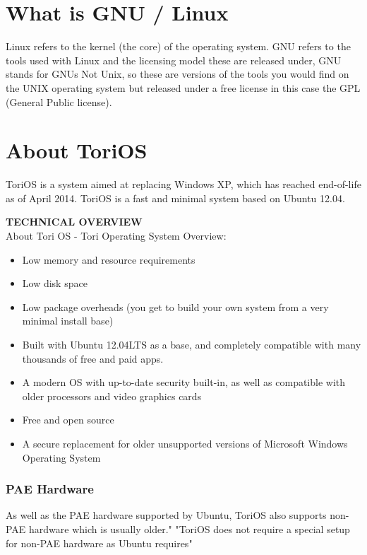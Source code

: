\documentclass[12pt,a4paper]{book}
\begin{document}
\chapter{What is GNU / Linux}

Linux refers to the kernel (the core) of the operating system.  GNU refers to the tools used with Linux and the licensing model these are released under,  GNU stands for GNUs Not Unix,  so these are versions of the tools you would find on the UNIX operating system but released under a free license in this case the GPL (General Public license).

\newpage 
\chapter{About ToriOS}
ToriOS \cite{ToriOS} is a system aimed at replacing Windows XP, which has reached end-of-life as of April 2014. ToriOS is a fast and minimal system based on Ubuntu 12.04. 

\textbf{TECHNICAL OVERVIEW} \\
About Tori OS - Tori Operating System Overview:

\begin{itemize}
\item{Low memory and resource requirements}
\item{Low disk space}
\item{Low package overheads (you get to build your own system from a very minimal install base)}
\item{Built with Ubuntu 12.04LTS as a base, and completely compatible with many thousands of free and paid apps.}
\item{ A modern OS with up-to-date security built-in, as well as compatible with older processors and video graphics cards}
\item{Free and open source}
\item{A secure replacement for older unsupported versions of Microsoft Windows Operating System} 
\end{itemize}

\subsection{PAE Hardware}

As well as the PAE hardware supported by Ubuntu, ToriOS also supports non-PAE hardware which is usually older." "ToriOS does not require a special setup for non-PAE hardware as Ubuntu requires" \cite{PAE2}
\end{document}
